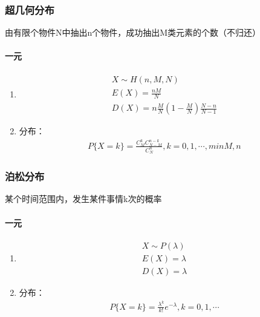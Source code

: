 \documentclass[12pt]{book}
\begin{document}
\subsubsection{超几何分布}



由有限个物件N中抽出n个物件，成功抽出M类元素的个数（不归还）


\paragraph{一元}


\begin{enumerate}[1.]
    \item \begin{gather*}
              X\sim H(n,M,N) \\
              E(X)=\frac{nM}{N} \\
              D(X)=n\frac{M}{N}\left(1-\frac{M}{N}\right)\frac{N-n}{N-1}
          \end{gather*}
    \item 分布：
          \begin{gather*}
              P\{X=k\} = \frac{ C_{M}^{k} C_{N-M}^{n-k} }{ C_{N}^{n} }, k=0,1,\cdots,min{M,n}
          \end{gather*}
\end{enumerate}




\subsubsection{泊松分布}


某个时间范围内，发生某件事情k次的概率

\paragraph{一元}

\begin{enumerate}[1.]
    \item \begin{gather*}
              X\sim P(\lambda) \\
              E(X)=\lambda \\
              D(X)=\lambda
          \end{gather*}
    \item 分布：
          \begin{gather*}
              P\{X=k\}=\frac{\lambda^k}{k!} e^{-\lambda}, k=0,1,\cdots
          \end{gather*}
\end{enumerate}
\end{document}
